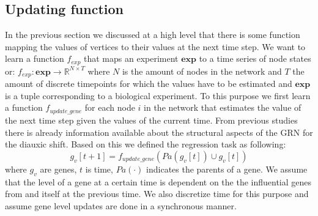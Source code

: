 \subsection{Updating function}\label{sec:update}
In the previous section we discussed at a high level that there is some function mapping the values of vertices to their values at the next time step. 
We want to learn a function $f_{exp}$ that maps an experiment $\mathbf{exp}$ to a time series of node states or: $ f_{exp}: \mathbf{exp} \to \mathbb{R}^{N \times T}$ where $N$ is the amount of nodes in the network and $T$ the amount of
discrete timepoints for which the values have to be estimated and $\mathbf{exp}$ is a tuple corresponding to a biological experiment. To this purpose we first learn a function $f_{update\_gene}$ for each node $i$ in the network that 
estimates the value of the next time step given the values of the current time.
From previous studies\cite{geistlinger2013comprehensive} there is already information available about the structural aspects of the GRN for the diauxic shift. 
Based on this we defined the regression task as following: 
\begin{equation}\label{eq:update}
 g_v[t+1] = f_{update\_gene}(Pa(g_v[t]) \cup g_v[t]) 
\end{equation}
where $g_v$ are genes, $t$ is time, $Pa(\cdot)$ indicates the parents of a gene.
We assume that the level of a gene at a certain time is dependent on the the influential genes from \cite{geistlinger2013comprehensive} and itself at the previous time. We also discretize time for this purpose and assume
gene level updates are done in a synchronous manner.
